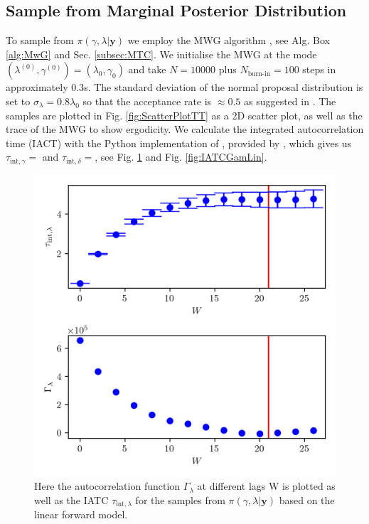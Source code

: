 \subsection{Sample from Marginal Posterior Distribution}
\label{subsec:firstMarg}
To sample from $\pi(\gamma, \lambda| \bm{y})$ we employ the MWG algorithm , see Alg. Box \ref{alg:MwG} and Sec. \ref{subsec:MTC}.
We initialise the MWG at the mode $(\lambda^{(0)} , \gamma^{(0)}  ) = ( \lambda_{0} , \gamma_{0}  )$ and take $N = 10000$ plus $N_{\text{burn-in}} = 100$ steps in approximately $0.3$s.
The standard deviation of the normal proposal distribution is set to $\sigma_{\lambda} = 0.8 \lambda_0$ so that the acceptance rate is $\approx 0.5$ as suggested in \cite{robertsLecNot}.
The samples are plotted in Fig. \ref{fig:ScatterPlotTT} as a 2D scatter plot, as well as the trace of the MWG to show ergodicity.
We calculate the integrated autocorrelation time (IACT) with the Python implementation of \cite{wolff2004monte}, provided by \cite{drikHesse}, which gives us $\tau_{\text{int}, \gamma} = $ and $\tau_{\text{int}, \delta} = $, see Fig. \ref{fig:IATCLamLin} and Fig. \ref{fig:IATCGamLin}.
\begin{figure}[ht!]
	\centering
	\includegraphics{UwerrTauIntFirstO3lam.png}
	\caption[IATC of $\lambda$ samples from $\pi(\gamma, \lambda| \bm{y})$, for linear model.]{Here the autocorrelation function $\Gamma_{\lambda}$ at different lags W is plotted as well as the IATC $\tau_{\text{int},\lambda}$ for the samples from $\pi(\gamma, \lambda| \bm{y})$ based on the linear forward model.}
	\label{fig:IATCLamLin}
\end{figure}
